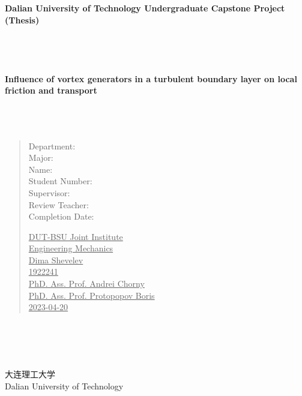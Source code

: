 \documentclass[12pt, a4paper]{article}
\begin{document}
	\begin{titlepage}
		\begin{center}
			\LARGE{\textbf{Dalian University of Technology Undergraduate Capstone Project (Thesis)}}
			~~~
			\\
			~~~
			\\
			~~~
			\\
			~~~
			\\
			~~~
			\\
			\Large{\textbf{Influence of vortex generators in a turbulent boundary layer on local friction and transport}}
			~~~
			\\
			~~~
			\\
			~~~
			\\
			~~~
			\\
			\begin{verse}
			\begin{minipage}{0.3\textwidth}
				Department:\\  
				Major:\\
				Name:\\                 
				Student Number:\\                
				Supervisor:\\          
				Review Teacher:\\
				Completion Date:\\
			\end{minipage}
			\hfill
			\begin{minipage}{0.6\textwidth}
				\underline{\hspace{1cm}DUT-BSU Joint Institute\hspace{2.3cm}}\\   
				\underline{\hspace{1cm}Engineering Mechanics\hspace{2.5cm}}\\  
				\underline{\hspace{1cm}Dima Shevelev\hspace{4.6cm}}\\   
				\underline{\hspace{1cm}1922241\hspace{6.2cm}}\\
				\underline{\hspace{1cm}PhD. Ass. Prof. Andrei Chorny\hspace{0.6cm}}\\ 
				\underline{\hspace{1cm}PhD. Ass. Prof. Protopopov Boris\hspace{0.1cm}}\\
				\underline{\hspace{1cm}2023-04-20\hspace{5.5cm}}\\  
			\end{minipage}
			\end{verse}
			~~~
			\\
			~~~
			\\
			~~~
			\\
			~~~
			\\
			\Large{大连理工大学}
			~~~
			\\
			Dalian University of Technology
		\end{center}  
	\end{titlepage}
\end{document}
